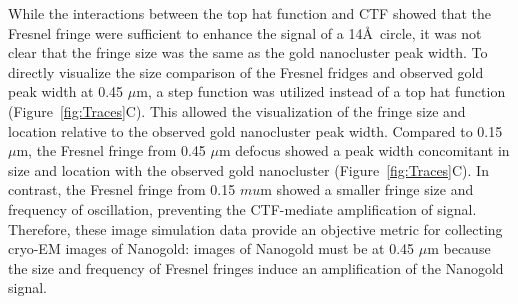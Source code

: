  \indent While the interactions between the top hat function and CTF showed that the Fresnel fringe were sufficient to enhance the signal of a 14\AA\ circle, it was not clear that the fringe size was the same as the gold nanocluster peak width. To directly visualize the size comparison of the Fresnel fridges and observed gold peak width at 0.45 $\mu$m, a step function was utilized instead of a top hat function (Figure~\ref{fig:Traces}C). This allowed the visualization of the fringe size and location relative to the observed gold nanocluster peak width. Compared to 0.15 $\mu$m, the Fresnel fringe from 0.45 $\mu$m defocus showed a peak width concomitant in size and location with the observed gold nanocluster (Figure~\ref{fig:Traces}C). In contrast, the Fresnel fringe from 0.15 $mu$m showed a smaller fringe size and frequency of oscillation, preventing the CTF-mediate amplification of signal. Therefore, these image simulation data provide an objective metric for collecting cryo-EM images of Nanogold: images of Nanogold must be at 0.45 $\mu$m because the size and frequency of Fresnel fringes induce an amplification of the Nanogold signal.\\
 

